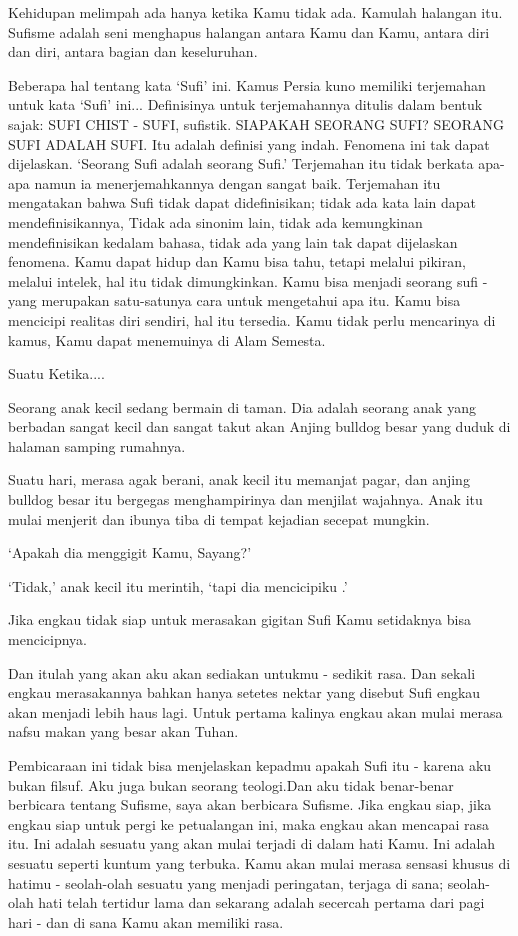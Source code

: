 Kehidupan melimpah ada hanya ketika Kamu tidak ada. Kamulah halangan itu. Sufisme adalah seni menghapus
halangan antara Kamu dan Kamu, antara diri dan diri, antara bagian dan keseluruhan.

Beberapa hal tentang kata ‘Sufi’ ini. Kamus Persia kuno memiliki terjemahan untuk kata ‘Sufi’ ini... Definisinya
untuk terjemahannya ditulis dalam bentuk sajak: SUFI CHIST - SUFI, sufistik. SIAPAKAH SEORANG SUFI? SEORANG SUFI ADALAH SUFI.
Itu adalah definisi yang indah. Fenomena ini tak dapat dijelaskan. ‘Seorang Sufi adalah seorang Sufi.’  Terjemahan itu tidak berkata apa-apa
namun ia menerjemahkannya dengan sangat baik. Terjemahan itu mengatakan bahwa Sufi tidak dapat didefinisikan; tidak ada kata lain dapat mendefinisikannya, Tidak ada sinonim lain, tidak ada kemungkinan mendefinisikan kedalam bahasa, tidak ada yang lain tak dapat dijelaskan
fenomena. Kamu dapat hidup dan Kamu bisa tahu, tetapi melalui pikiran, melalui intelek, hal itu 
tidak dimungkinkan. Kamu bisa menjadi seorang sufi - yang merupakan satu-satunya cara untuk mengetahui apa itu. Kamu bisa mencicipi
realitas diri sendiri, hal itu tersedia. Kamu tidak perlu mencarinya di kamus, Kamu dapat menemuinya di Alam Semesta.

Suatu Ketika....

Seorang anak kecil sedang bermain di taman. Dia adalah seorang anak yang berbadan sangat kecil dan sangat takut akan
Anjing bulldog besar yang duduk di halaman samping rumahnya.

Suatu hari, merasa agak berani, anak kecil itu memanjat pagar, dan anjing bulldog besar itu bergegas
menghampirinya dan menjilat wajahnya. Anak itu mulai menjerit dan ibunya tiba di tempat kejadian secepat
mungkin.

‘Apakah dia menggigit Kamu, Sayang?’

‘Tidak,’ anak kecil itu merintih, ‘tapi dia mencicipiku .’

Jika engkau tidak siap untuk merasakan gigitan Sufi Kamu setidaknya bisa mencicipnya.

Dan itulah yang akan aku akan sediakan untukmu - sedikit rasa. Dan sekali engkau merasakannya bahkan hanya setetes nektar yang disebut Sufi engkau akan menjadi lebih haus lagi. Untuk pertama kalinya engkau akan mulai merasa nafsu makan yang besar akan Tuhan.

Pembicaraan ini tidak bisa menjelaskan kepadmu apakah Sufi itu - karena aku bukan filsuf. Aku juga bukan
seorang teologi.Dan aku tidak benar-benar berbicara tentang Sufisme, saya akan berbicara Sufisme. Jika engkau siap,
jika engkau siap untuk pergi ke petualangan ini, maka engkau akan mencapai rasa itu. Ini adalah sesuatu yang akan mulai terjadi di dalam hati Kamu. Ini adalah sesuatu seperti kuntum yang terbuka. Kamu akan mulai merasa sensasi khusus
di hatimu - seolah-olah sesuatu yang menjadi peringatan, terjaga di sana; seolah-olah hati telah
tertidur lama dan sekarang adalah secercah pertama dari pagi hari - dan di sana Kamu akan memiliki rasa.

